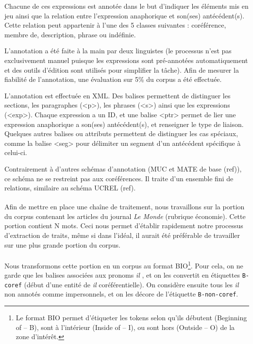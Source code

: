 \documentclass[a4paper,12pt]{article}
\begin{document}
Chacune de ces expressions est annotée dans le but d'indiquer les éléments mis en jeu ainsi que la relation entre l'expression anaphorique et son(ses) antécédent(s). Cette relation peut appartenir à l'une des 5 classes suivantes : coréférence, membre de, description, phrase ou indéfinie.

L'annotation a été faite à la main par deux linguistes (le processus n'est pas exclusivement manuel puisque les expressions sont pré-annotées automatiquement et des outils d'édition sont utilisés pour simplifier la tâche). Afin de mesurer la fiabilité de l'annotation, une évaluation sur 5\% du corpus a été effectuée.

L'annotation est effectuée en XML. Des balises permettent de distinguer les sections, les paragraphes (<p>), les phrases (<s>) ainsi que les expressions (<exp>). Chaque expression a un ID, et une balise <ptr> permet de lier une expression anaphorique a son(ses) antécédent(s), et renseigner le type de liaison. Quelques autres balises ou attributs permettent de distinguer les cas spéciaux, comme la balise <seg> pour délimiter un segment d'un antécédent spécifique à celui-ci.

Contrairement à d'autres schémas d'annotation (MUC et MATE de base (ref)), ce schéma ne se restreint pas aux coréférences. Il traite d'un ensemble fini de relations, similaire au schéma UCREL (ref).

\paragraph{}
Afin de mettre en place une chaîne de traitement, nous travaillons sur la portion du corpus contenant les articles du journal \emph{Le Monde} (rubrique économie). Cette portion contient N mots. Ceci nous permet d'établir rapidement notre processus d'extraction de traits, même si dans l'idéal, il aurait été préférable de travailler sur une plus grande portion du corpus.

\paragraph{}
Nous transformons cette portion en un corpus au format BIO\footnote{Le format BIO permet d'étiqueter les tokens selon qu'ils débutent (Beginning of -- B), sont à l'intérieur (Inside of -- I), ou sont hors (Outside -- O) de la zone d'intérêt.}. Pour cela, on ne garde que les balises associées aux pronoms \og \textit{il} \fg{}, et on les convertit en étiquettes \verb!B-coref! (début d'une entité de \og \textit{il} \fg{} coréférentielle). On considère ensuite tous les \og \textit{il} \fg{} non annotés comme impersonnels, et on les décore de l'étiquette \verb!B-non-coref!.
\end{document}
